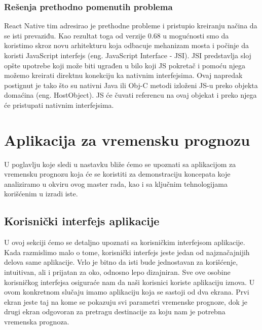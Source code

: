 \documentclass[12pt,oneside]{memoir}
\begin{document}
\subsection{Rešenja prethodno pomenutih problema}

React Native tim adresirao je prethodne probleme i pristupio kreiranju načina da se isti prevaziđu. Kao rezultat toga od verzije 0.68 u mogućnosti smo da koristimo skroz novu arhitekturu koja odbacuje mehanizam mosta i počinje da koristi JavaScript interfejs (eng. JavaScript Interface - JSI). JSI predstavlja sloj opšte upotrebe koji može biti ugrađen u bilo koji JS pokretač i pomoću njega možemo kreirati direktnu konekciju ka nativnim interfejsima. Ovaj napredak postignut je tako što su nativni Java ili Obj-C metodi izloženi JS-u preko objekta domaćina (eng. HostObject). JS će čuvati referencu na ovaj objekat i preko njega će pristupati nativnim interfejsima.

\chapter{Aplikacija za vremensku prognozu}

U poglavlju koje sledi u nastavku bliže ćemo se upoznati sa aplikacijom za vremensku prognozu koja će se koristiti za demonstraciju koncepata koje analiziramo u okviru ovog master rada, kao i sa ključnim tehnologijama korišćenim u izradi iste.

\section{Korisnički interfejs aplikacije}

U ovoj sekciji ćemo se detaljno upoznati sa korisničkim interfejsom aplikacije. Kada razmislimo malo o tome, korisnički interfejs jeste jedan od najznačajnijih delova same aplikacije. Vrlo je bitno da isti bude jednostavan za korišćenje, intuitivan, ali i prijatan za oko, odnosno lepo dizajniran. Sve ove osobine korisničkog interfejsa osiguraće nam da naši korisnici koriste aplikaciju iznova. U ovom konkretnom slučaju imamo aplikaciju koja se sastoji od dva ekrana. Prvi ekran jeste taj na kome se pokazuju svi parametri vremenske prognoze, dok je drugi ekran odgovoran za pretragu destinacije za koju nam je potrebna vremenska prognoza.
\end{document}
